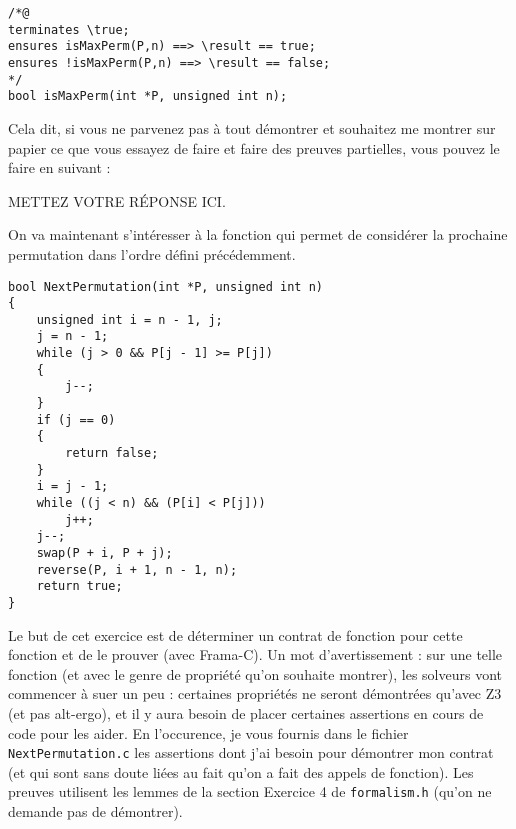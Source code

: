 \documentclass[11pt,answers]{exam}
\begin{document}
\begin{questions}
\begin{parts}
    \begin{lstlisting}
/*@
terminates \true;
ensures isMaxPerm(P,n) ==> \result == true;
ensures !isMaxPerm(P,n) ==> \result == false;
*/
bool isMaxPerm(int *P, unsigned int n);
    \end{lstlisting}

    Cela dit, si vous ne parvenez pas à tout démontrer et souhaitez me montrer sur papier ce que vous essayez de faire et faire des preuves partielles, vous pouvez le faire en suivant :

    \begin{solutionorbox}
        METTEZ VOTRE RÉPONSE ICI.
    \end{solutionorbox}

    \end{parts}



    On va maintenant s’intéresser à la fonction qui permet de considérer la prochaine permutation dans l’ordre défini précédemment.

    \begin{lstlisting}
bool NextPermutation(int *P, unsigned int n)
{
    unsigned int i = n - 1, j;
    j = n - 1;
    while (j > 0 && P[j - 1] >= P[j])
    {
        j--;
    }
    if (j == 0)
    {
        return false;
    }
    i = j - 1;
    while ((j < n) && (P[i] < P[j]))
        j++;
    j--;
    swap(P + i, P + j);
    reverse(P, i + 1, n - 1, n);
    return true;
}
    \end{lstlisting}

    Le but de cet exercice est de déterminer un contrat de fonction pour cette fonction et de le prouver (avec Frama-C).
    Un mot d’avertissement : sur une telle fonction (et avec le genre de propriété qu’on souhaite montrer), les solveurs vont commencer à suer un peu : certaines propriétés ne seront démontrées qu’avec Z3 (et pas alt-ergo), et il y aura besoin de placer certaines assertions en cours de code pour les aider. En l’occurence, je vous fournis dans le fichier \texttt{NextPermutation.c} les assertions dont j’ai besoin pour démontrer mon contrat (et qui sont sans doute liées au fait qu’on a fait des appels de fonction).
    Les preuves utilisent les lemmes de la section Exercice 4 de \texttt{formalism.h} (qu’on ne demande pas de démontrer).

    \begin{parts}


\end{parts}
\end{questions}
\end{document}
